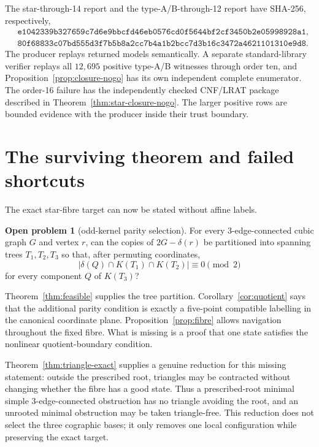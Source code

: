 \documentclass[11pt]{article}
\theoremstyle{definition}
\newtheorem{problem}[theorem]{Open problem}
\theoremstyle{remark}
\newcommand{\1}{\mathbf 1}
\begin{document}
The star-through-14 report and the type-A/B-through-12 report have
SHA-256, respectively,
\[
\begin{split}
&\texttt{e1042339b327659c7d6e9bbcfd46eb0576cd0f5644bf2cf3450b2e05998928a1},\\
&\texttt{80f68833c07bd555d3f7b5b8a2cc7b4a1b2bcc7d3b16c3472a4621101310e9d8}.
\end{split}
\]
The producer replays returned models semantically.  A separate
standard-library verifier replays all \(12{,}695\) positive type-A/B
witnesses through order ten, and
Proposition~\ref{prop:closure-nogo} has its own independent complete
enumerator.  The order-16 failure has the independently checked
CNF/LRAT package described in Theorem~\ref{thm:star-closure-nogo}.
The larger positive rows are bounded evidence with the producer inside
their trust boundary.

\section{The surviving theorem and failed shortcuts}

The exact star-fibre target can now be stated without affine labels.

\begin{problem}[odd-kernel parity selection]\label{prob:kernel}
For every 3-edge-connected cubic graph \(G\) and vertex \(r\), can the
copies of \(2G-\delta(r)\) be partitioned into spanning trees
\(T_1,T_2,T_3\) so that, after permuting coordinates,
\[
 |\delta(Q)\cap K(T_1)\cap K(T_2)|\equiv0\pmod2
\]
for every component \(Q\) of \(K(T_3)\)?
\end{problem}

Theorem~\ref{thm:feasible} supplies the tree partition.
Corollary~\ref{cor:quotient} says that the additional parity condition is
exactly a five-point compatible labelling in the canonical coordinate
plane.  Proposition~\ref{prop:fibre} allows navigation throughout the
fixed fibre.  What is missing is a proof that one state satisfies the
nonlinear quotient-boundary condition.

Theorem~\ref{thm:triangle-exact} supplies a genuine reduction for this
missing statement: outside the prescribed root, triangles may be contracted
without changing whether the fibre has a good state.  Thus a
prescribed-root minimal simple 3-edge-connected obstruction has no triangle
avoiding the root, and an unrooted minimal obstruction may be taken
triangle-free.  This reduction does not select the three cographic bases;
it only removes one local configuration while preserving the exact target.
\end{document}
